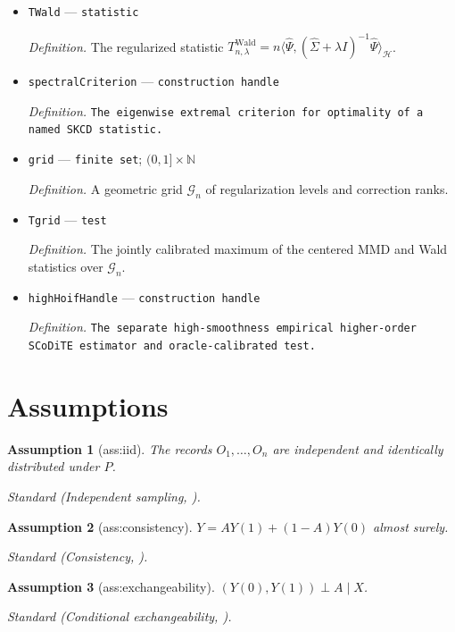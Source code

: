 \documentclass{article}
\newtheorem{assumption}{Assumption}
\begin{document}
\begin{itemize}
  \item \texttt{TWald} --- \texttt{statistic}
  \par\smallskip\noindent\emph{Definition.} The regularized statistic \(T_{n,\lambda}^{\mathrm{Wald}}=n\langle\widehat\Psi,(\widehat\Sigma+\lambda I)^{-1}\widehat\Psi\rangle_{\mathcal H}\).
  \item \texttt{spectralCriterion} --- \texttt{construction handle}
  \par\smallskip\noindent\emph{Definition.} \texttt{The eigenwise extremal criterion for optimality of a named SKCD statistic.}
  \item \texttt{grid} --- \texttt{finite set}; \((0,1]\times\mathbb N\)
  \par\smallskip\noindent\emph{Definition.} A geometric grid \(\mathcal G_n\) of regularization levels and correction ranks.
  \item \texttt{Tgrid} --- \texttt{test}
  \par\smallskip\noindent\emph{Definition.} The jointly calibrated maximum of the centered MMD and Wald statistics over \(\mathcal G_n\).
  \item \texttt{highHoifHandle} --- \texttt{construction handle}
  \par\smallskip\noindent\emph{Definition.} \texttt{The separate high-\allowbreak{}smoothness empirical higher-\allowbreak{}order SCoDiTE estimator and oracle-\allowbreak{}calibrated test.}
\end{itemize}

\section{Assumptions}

\begin{assumption}[ass:iid]\label{ass:iid}
The records \(O_1,\ldots,O_n\) are independent and identically distributed under \(P\).
\par\smallskip\noindent\emph{Standard} (Independent sampling, \cite{JainLuedtke2026SCoDiTE}).
\end{assumption}

\begin{assumption}[ass:consistency]\label{ass:consistency}
\(Y=AY(1)+(1-A)Y(0)\) almost surely.
\par\smallskip\noindent\emph{Standard} (Consistency, \cite{JainLuedtke2026SCoDiTE}).
\end{assumption}

\begin{assumption}[ass:exchangeability]\label{ass:exchangeability}
\((Y(0),Y(1))\perp A\mid X\).
\par\smallskip\noindent\emph{Standard} (Conditional exchangeability, \cite{JainLuedtke2026SCoDiTE}).
\end{assumption}
\end{document}
